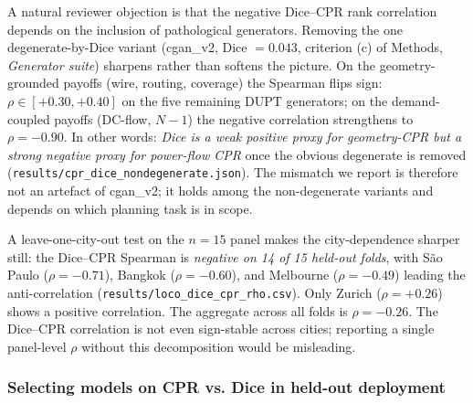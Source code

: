 \documentclass[10pt,a4paper]{article}
\begin{document}
A natural reviewer objection is that the negative Dice--CPR rank
correlation depends on the inclusion of pathological generators.
Removing the one degenerate-by-Dice variant (cgan\_v2,
Dice $= 0.043$, criterion (c) of Methods, \emph{Generator suite})
sharpens rather than softens the picture. On the geometry-grounded
payoffs (wire, routing, coverage) the Spearman flips sign:
$\rho \in [+0.30, +0.40]$ on the five remaining DUPT generators;
on the demand-coupled payoffs (DC-flow, $N{-}1$) the negative
correlation strengthens to $\rho = -0.90$. In other words: \emph{Dice
is a weak positive proxy for geometry-CPR but a strong negative
proxy for power-flow CPR} once the obvious degenerate is removed
(\texttt{results/cpr\_dice\_nondegenerate.json}). The
mismatch we report is therefore not an artefact of cgan\_v2; it
holds among the non-degenerate variants and depends on which
planning task is in scope.

A leave-one-city-out test on the $n = 15$ panel makes the
city-dependence sharper still: the Dice--CPR Spearman is
\emph{negative on 14 of 15 held-out folds}, with São Paulo
($\rho = -0.71$), Bangkok ($\rho = -0.60$), and Melbourne
($\rho = -0.49$) leading the anti-correlation
(\texttt{results/loco\_dice\_cpr\_rho.csv}). Only Zurich
($\rho = +0.26$) shows a positive correlation. The aggregate
across all folds is $\rho = -0.26$. The Dice--CPR
correlation is not even sign-stable across cities; reporting a
single panel-level $\rho$ without this decomposition would be
misleading.

\subsubsection{Selecting models on CPR vs. Dice in held-out
deployment}
\end{document}
